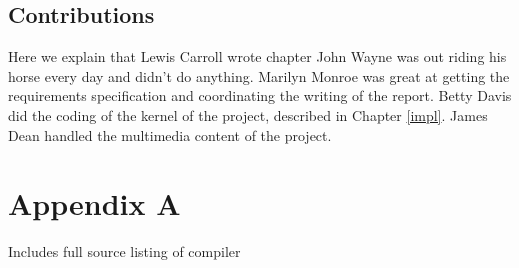 \documentclass{l3proj}
\begin{document}
\section{Contributions}
\label{cont}
Here we explain that Lewis Carroll wrote chapter  John Wayne
was out riding his horse every day and didn't do anything. Marilyn Monroe
was great at getting the requirements specification and coordinating the
writing of the report. Betty Davis did the coding of the kernel of the
project, described in Chapter \ref{impl}.  James Dean handled the
multimedia content of the project.
\chapter{Appendix A}
\label{appa}

Includes full source listing of compiler




\end{document}
